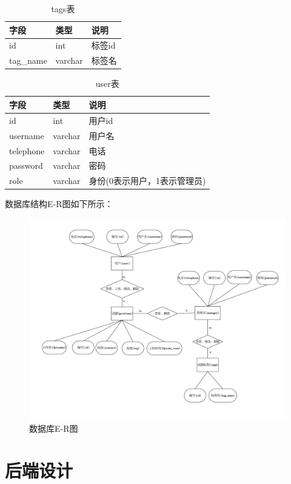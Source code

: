 \documentclass[a4paper,AutoFakeBold={2.7}]{ctexart} %
\begin{document}
\begin{table}[H]
	\caption{tags表}\label{tags表}
	\centering
	\begin{tabular}{p{3cm}<{\centering} p{3cm}<{\centering} p{3cm}<{\centering}}
		\toprule[1.5pt]
		字段&类型&说明\\
		\midrule[0.75pt]
		id&int&标签id\\
		tag\_name&varchar&标签名\\
		\bottomrule[1pt]
	\end{tabular}
\end{table}

\begin{table}[H]
	\caption{user表}\label{user表}
	\centering
	\begin{tabular}{p{3cm}<{\centering} p{3cm}<{\centering} p{3cm}<{\centering}}
		\toprule[1.5pt]
		字段&类型&说明\\
		\midrule[0.75pt]
		id&int&用户id\\
		username&varchar&用户名\\
		telephone&varchar&电话\\
		password&varchar&密码\\
		role&varchar&身份(0表示用户，1表示管理员)\\
		\bottomrule[1pt]
	\end{tabular}
\end{table}

数据库结构E-R图如下所示：

\begin{figure}[]
    \centering
    \includegraphics[width=0.7\linewidth]{./图片/数据库E-R图.pdf}
    \caption{数据库E-R图}\label{数据库E-R图}
\end{figure}

\section{后端设计}
\end{document}
